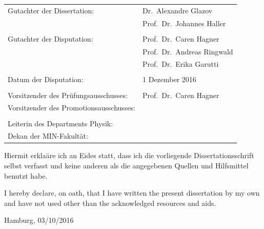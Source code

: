 \documentclass[oneside,11pt]{Classes/PhDthesisPSnPDF}
\begin{document}

\newpage
\thispagestyle{empty}
\vspace{12mm}
\begin{tabular}{ll}
Gutachter der Dissertation: & Dr.~Alexandre Glazov \\
                            & Prof.~Dr.~Johannes Haller \\
    \\
Gutachter der Disputation:  & Prof.~Dr.~Caren Hagner \\
							              & Prof.~Dr.~Andreas Ringwald \\
							              & Prof.~Dr.~Erika Garutti \\

    \\
Datum der Disputation: & 1 Dezember 2016 \\
\\
Vorsitzender des Pr\"ufungsausschusses: & Prof.~Dr.~Caren Hagner \\
Vorsitzender des Promotionsausschusses: & \\
    \\
Leiterin des Departments Physik:        & \\
Dekan der MIN-Fakult\"at:               &
\end{tabular}

\vspace{10cm}
Hiermit erkla\"are ich an Eides statt, dass ich die vorliegende Dissertationsschrift selbst verfasst und keine anderen als die angegebenen Quellen und Hilfsmittel benutzt habe.

\vspace{1cm}
I hereby declare, on oath, that I have written the present dissertation by my own and have not used other than the acknowledged resources and aids.

\vspace{2cm}
\hspace{0.6\textwidth} Hamburg, 03/10/2016

\end{document}
